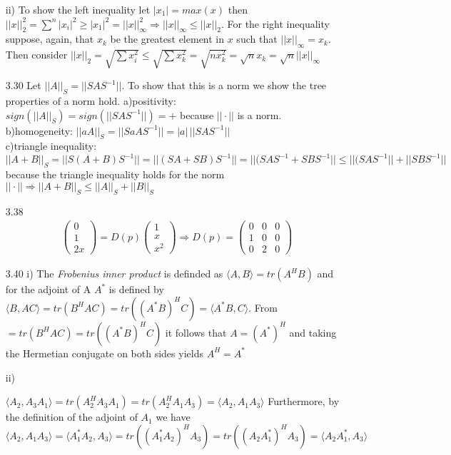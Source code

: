 \documentclass[letterpaper,12pt]{article}
\theoremstyle{definition}
\begin{document}
\begin{enumerate}
ii) To show the left inequality let $|x_1| = max(x)$ then $ ||x||_2^2 = \sum^n |x_i|^2  \geq |x_1|^2 = ||x||_{\infty}^2 \Rightarrow ||x||_{\infty} \leq ||x||_2$. For the right inequality suppose, again, that $x_k$ be the greatest element in $x$ such that $||x||_{\infty} = x_k $. Then consider $||x||_2 = \sqrt{\sum x_i^2} \leq \sqrt{\sum x_k^2}= \sqrt{ n x_k^2}   = \sqrt{n} x_k =\sqrt{n} ||x||_{\infty} $

\item[3.30]
Let $||A||_S = ||SAS^{-1}||$. To show that this is a norm we show the tree properties of a norm hold.
a)positivity: $sign(||A||_S) = sign(||SAS^{-1}||)=+$ because $||\cdot||$ is a norm.\\

b)homogeneity: $||aA||_S = ||SaAS^{-1}|| = |a|\, ||SAS^{-1}|| $\\

c)triangle inequality: $||A+B||_S = ||S(A+B)S^{-1}||= ||(SA+SB)S^{-1}|| = 
||(SAS^{-1} + SBS^{-1}|| \leq ||(SAS^{-1}|| + ||SBS^{-1}||$ because the triangle inequality holds for the norm $||\cdot|| \Rightarrow ||A+B||_S \leq||A||_S +||B||_S $

\item[3.38]
\begin{align*}
\begin{pmatrix}
0 \\1 \\ 2x
\end{pmatrix}=D(p)\begin{pmatrix}
1\\x \\ x^2
\end{pmatrix} \Rightarrow D(p)=\begin{pmatrix}
0 & 0 &0\\ 1&0 &0 \\0& 2&0
\end{pmatrix}
\end{align*}
\item[3.40]
i) The \textit{Frobenius inner product} is definded as $ \langle A,B \rangle = tr(A^HB)$ and for the adjoint of A $A^*$ is defined by $\langle B,AC \rangle   = tr(B^HAC) = tr((A^*B)^HC) = \langle A^*B,C \rangle $. From $= tr(B^HAC) = tr((A^*B)^HC)$ it follows that $A=(A^*)^H $ and taking the Hermetian conjugate on both sides yields $A^H=A^* $

ii)

$\langle A_2, A_3 A_1\rangle = tr(A_2^HA_3A_1) = tr(A_2^HA_1A_3) = \langle A_2, A_1 A_3\rangle$
Furthermore, by the definition of the adjoint of $A_1$ we have $\langle A_2, A_1 A_3\rangle = \langle A_1^*A_2, A_3\rangle = tr((A_1^*A_2)^H A_3) = tr((A_2A_1^*)^H A_3) = \langle A_2A_1^*,A_3 \rangle$


\end{enumerate}
\end{document}
